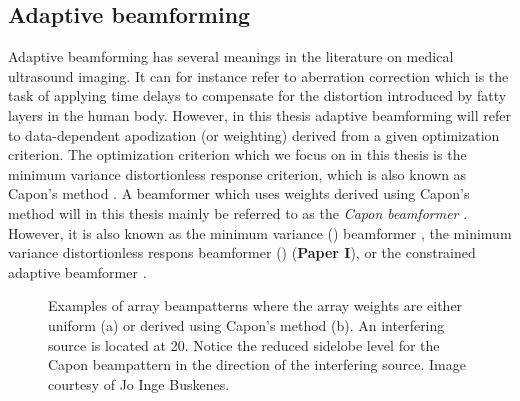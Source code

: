 \subsection{Adaptive beamforming}\label{sec:adaptbf}
Adaptive beamforming has several meanings in the literature on medical ultrasound imaging. It can for instance refer to aberration correction which is the task of applying time delays to compensate for the distortion introduced by fatty layers in the human body. However, in this thesis adaptive beamforming will refer to data-dependent apodization (or weighting) derived from a given optimization criterion. The optimization criterion which we focus on in this thesis is the minimum variance distortionless response criterion, which is also known as Capon's method \cite{Capon1969}. A beamformer which uses weights derived using Capon's method will in this thesis mainly be referred to as the \textit{Capon beamformer} \cite{Vignon2008}. However, it is also known as the minimum variance  () beamformer \cite{Synnevag2007}, the minimum variance distortionless respons beamformer () (\textbf{Paper I}), or the constrained adaptive beamformer \cite{Mann2002}.

\begin{figure}[t!]
\caption{Examples of array beampatterns where the array weights are either uniform (a) or derived using Capon's method (b). An interfering source is located at 20\degree. Notice the reduced sidelobe level for the Capon beampattern in the direction of the interfering source. Image courtesy of Jo Inge Buskenes.}
\label{fig:weights}
\end{figure}

